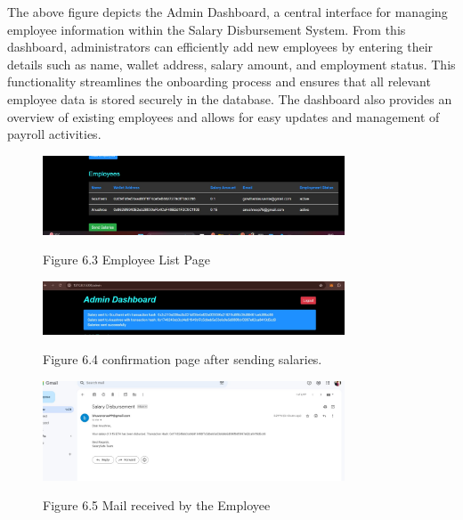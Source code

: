 \documentclass[12pt]{report}
\begin{document}
\begin{center}
    \justify
The above figure depicts the Admin Dashboard, a central interface for managing employee information within the Salary Disbursement System. From this dashboard, administrators can efficiently add new employees by entering their details such as name, wallet address, salary amount, and employment status. This functionality streamlines the onboarding process and ensures that all relevant employee data is stored securely in the database. The dashboard also provides an overview of existing employees and allows for easy updates and management of payroll activities.
\end{center}
\begin{figure}[h!]
  \centering
  \includegraphics[width=0.8\textwidth]{emplist.jpg}
  \begin{center}
    Figure 6.3 Employee List Page 
\end{center}
\end{figure}
\begin{figure}[h!]
  \centering
  \includegraphics[width=0.8\textwidth]{sent.jpg}
  \begin{center}
    Figure 6.4 confirmation page after sending salaries.
\end{center}
\end{figure}
\vspace{4cm}
\begin{figure}[h!]
  \centering
  \includegraphics[width=0.8\textwidth]{mail.jpg}
  \begin{center}
    Figure 6.5 Mail received by the Employee
\end{center}
\end{figure}
\end{document}

